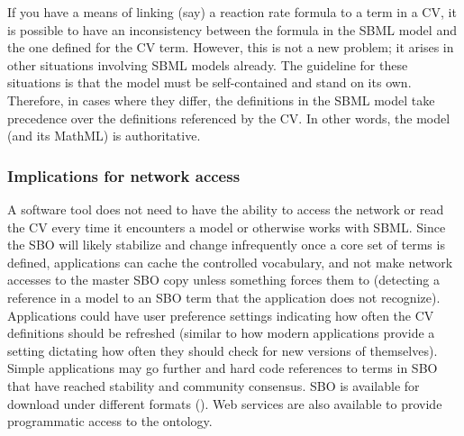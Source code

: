 If you have a means of linking (say) a reaction rate formula to a
term in a CV, it is possible to have an inconsistency between the
formula in the SBML model and the one defined for the CV term.
However, this is not a new problem; it arises in other situations
involving SBML models already.  The guideline for these situations
is that the model must be self-contained and stand on its own.
Therefore, in cases where they differ, the definitions in the SBML
model take precedence over the definitions referenced by the CV.
In other words, the model (and its MathML) is authoritative.


\subsubsection{Implications for network access}
\label{sec:sbo-implications-for-network-access}

A software tool does not need to have the ability to access the
network or read the CV every time it encounters a model or
otherwise works with SBML.  Since the SBO will likely stabilize
and change infrequently once a core set of terms is defined,
applications can cache the controlled vocabulary, and not make
network accesses to the master SBO copy unless something forces
them to (\eg detecting a reference in a model to an SBO term that
the application does not recognize).  Applications could have user
preference settings indicating how often the CV definitions should
be refreshed (similar to how modern applications provide a setting
dictating how often they should check for new versions of
themselves).  Simple applications may go further and hard code
references to terms in SBO that have reached stability and
community consensus. SBO is available for download under different
formats (\sboref).  Web services are also available to provide
programmatic access to the ontology.
